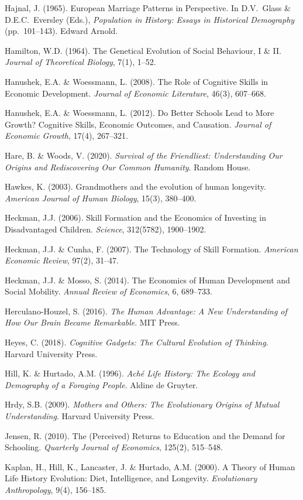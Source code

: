 Hajnal, J. (1965). European Marriage Patterns in Perspective. In
D.V.~Glass \& D.E.C.~Eversley (Eds.), \emph{Population in History:
Essays in Historical Demography} (pp.~101--143). Edward Arnold.

Hamilton, W.D. (1964). The Genetical Evolution of Social Behaviour, I
\& II. \emph{Journal of Theoretical Biology}, 7(1), 1--52.

Hanushek, E.A. \& Woessmann, L. (2008). The Role of Cognitive Skills in
Economic Development. \emph{Journal of Economic Literature}, 46(3),
607--668.

Hanushek, E.A. \& Woessmann, L. (2012). Do Better Schools Lead to More
Growth? Cognitive Skills, Economic Outcomes, and Causation.
\emph{Journal of Economic Growth}, 17(4), 267--321.

Hare, B. \& Woods, V. (2020). \emph{Survival of the Friendliest:
Understanding Our Origins and Rediscovering Our Common Humanity}.
Random House.

Hawkes, K. (2003). Grandmothers and the evolution of human
longevity. \emph{American Journal of Human Biology}, 15(3), 380--400.

Heckman, J.J. (2006). Skill Formation and the Economics of Investing
in Disadvantaged Children. \emph{Science}, 312(5782), 1900--1902.

Heckman, J.J. \& Cunha, F. (2007). The Technology of Skill Formation.
\emph{American Economic Review}, 97(2), 31--47.

Heckman, J.J. \& Mosso, S. (2014). The Economics of Human Development
and Social Mobility. \emph{Annual Review of Economics}, 6, 689--733.

Herculano-Houzel, S. (2016). \emph{The Human Advantage: A New
Understanding of How Our Brain Became Remarkable}. MIT Press.

Heyes, C. (2018). \emph{Cognitive Gadgets: The Cultural Evolution of
Thinking}. Harvard University Press.

Hill, K. \& Hurtado, A.M. (1996). \emph{Aché Life History: The Ecology
and Demography of a Foraging People}. Aldine de Gruyter.

Hrdy, S.B. (2009). \emph{Mothers and Others: The Evolutionary Origins
of Mutual Understanding}. Harvard University Press.

Jensen, R. (2010). The (Perceived) Returns to Education and the Demand
for Schooling. \emph{Quarterly Journal of Economics}, 125(2), 515--548.

Kaplan, H., Hill, K., Lancaster, J. \& Hurtado, A.M. (2000). A Theory
of Human Life History Evolution: Diet, Intelligence, and Longevity.
\emph{Evolutionary Anthropology}, 9(4), 156--185.

